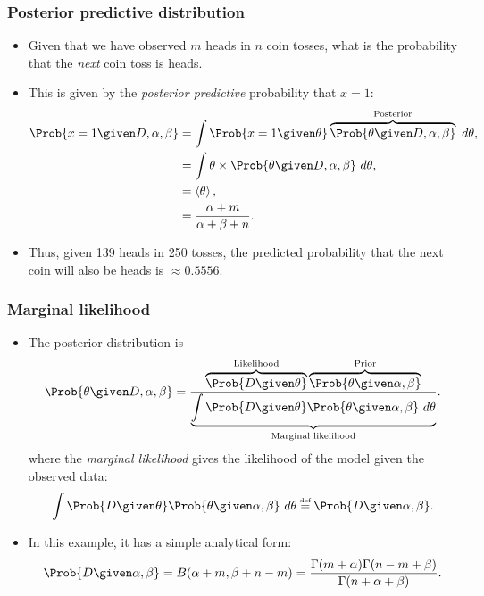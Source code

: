 \documentclass{slides}
\begin{document}
\begin{frame}
	\frametitle{Posterior predictive distribution}

	\begin{itemize}
		\item Given that we have observed $m$ heads in $n$ coin tosses, what is the probability that the \emph{next} coin toss is heads.
		\item This is given by the \emph{posterior predictive} probability that $x=1$:
			\begin{align*}
				\Prob{x=1\given D, \alpha, \beta} &= \int \Prob{x=1 \given \theta} \overbrace{\Prob{\theta\given D, \alpha, \beta}}^{\text{Posterior}}\ d\theta,\\
				&= \int \theta \times \Prob{\theta\given D, \alpha, \beta} \ d\theta,\\
				&= \left\langle \theta \right\rangle,\\
				&= \frac{\alpha+m}{\alpha+\beta+n}.
			\end{align*}
		\item Thus, given 139 heads in 250 tosses, the predicted probability that the next coin will also be heads is $\approx 0.5556$.
	\end{itemize}
\end{frame}
\begin{frame}
	\frametitle{Marginal likelihood}	
	\begin{itemize}
		\item The posterior distribution is 
		\[
			\Prob{\theta\given D, \alpha,\beta}
			= \frac{\overbrace{\Prob{D\given\theta}}^{\text{Likelihood}}\overbrace{\Prob{\theta\given\alpha,\beta}}^{\text{Prior}}}
			{\underbrace{\int\Prob{D\given\theta}\Prob{\theta\given\alpha,\beta}\ d\theta}_{\text{Marginal likelihood}}}.
		\]
		where the \emph{marginal likelihood} gives the likelihood of the model given the observed data:
		\[
			\int\Prob{D\given\theta}\Prob{\theta\given\alpha,\beta}\ d\theta \defeq \Prob{D\given \alpha,\beta}.
		\]
	\item In this example, it has a simple analytical form:
		\[
			\Prob{D\given \alpha,\beta} = B(\alpha+m, \beta+n-m) = \frac{\Gamma(m + \alpha)\Gamma(n - m + \beta)}{\Gamma(n + \alpha+\beta)}.
		\]


	\end{itemize}
\end{frame}
\end{document}
